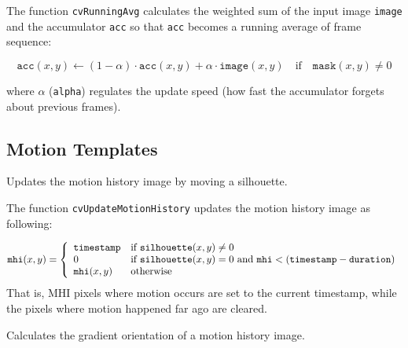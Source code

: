 The function \texttt{cvRunningAvg} calculates the weighted sum of the input image
\texttt{image} and the accumulator \texttt{acc} so that \texttt{acc}
becomes a running average of frame sequence:

\[ \texttt{acc}(x,y) \leftarrow (1-\alpha) \cdot \texttt{acc}(x,y) + \alpha \cdot \texttt{image}(x,y) \quad \text{if} \quad \texttt{mask}(x,y) \ne 0 \]

where $\alpha$ (\texttt{alpha}) regulates the update speed (how fast the accumulator forgets about previous frames).

\subsection{Motion Templates}

\label{UpdateMotionHistory}

Updates the motion history image by moving a silhouette.


\begin{description}
\end{description}

The function \texttt{cvUpdateMotionHistory} updates the motion history image as following:

\[
\texttt{mhi}(x,y)=\left\{ \begin{array}{l l} \texttt{timestamp} & \mbox{if $\texttt{silhouette}(x,y) \ne 0$}\\ 0 & \mbox{if $\texttt{silhouette}(x,y) = 0$ and $\texttt{mhi} < (\texttt{timestamp} - \texttt{duration})$}\\ \texttt{mhi}(x,y) & \mbox{otherwise}\\ \end{array} \right.
\]
That is, MHI pixels where motion occurs are set to the current timestamp, while the pixels where motion happened far ago are cleared.

\label{CalcMotionGradient}

Calculates the gradient orientation of a motion history image.


